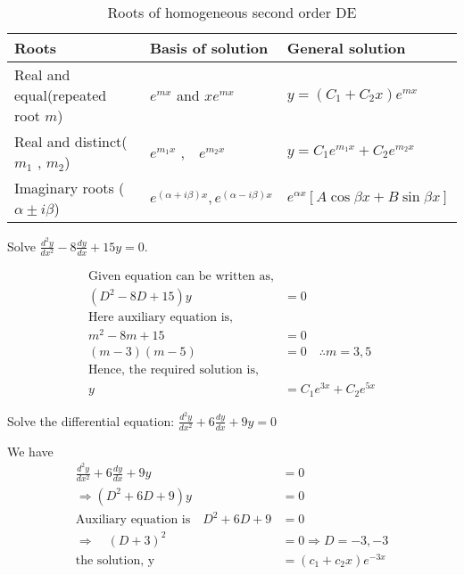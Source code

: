 \setlength\extrarowheight{10pt}
\begin{table}[H]
\begin{tabular}{|m{5cm}|m{4cm}|m{4cm}|}
\hline
Roots&Basis of solution&General solution\\\hline
Real and  equal(repeated root $m$)& $e^{m x}$ and $xe^{m x}$&$
y=\left(C_{1}+C_{2} x\right) e^{m x}
$\\\hline
Real and  distinct($m_{1}$ , $m_{2}$)& $e^{m_{1} x}$ ,$\quad e^{m_{2} x}$ &$
y=C_{1} e^{m_{1} x}+C_{2} e^{m_{2} x}
$\\\hline
Imaginary roots ($\alpha \pm i \beta$)&$ e^{(\alpha+i \beta) x}, e^{(\alpha-i \beta) x}$&$e^{\alpha x}[A \cos \beta x+B \sin \beta x]$\\\hline

\end{tabular}
\caption{Roots of homogeneous second order DE}
\end{table}
\begin{exercise}
	Solve $\frac{d^{2} y}{d x^{2}}-8 \frac{d y}{d x}+15 y=0$.
\end{exercise}
\begin{answer}
	\begin{align*}
	\text{Given equation can be written as,}\\
	\left(D^{2}-8 D+15\right) y&=0\\
	\text{Here auxiliary equation is,}\\ m^{2}-8 m+15&=0\\
	(m-3)(m-5)&=0 \quad \therefore m=3,5\\\text{Hence, the required solution is,}\\
	y&=C_{1} e^{3 x}+C_{2} e^{5 x}
	\end{align*}
\end{answer}
\begin{exercise}
	Solve the differential equation:
	$
	\frac{d^{2} y}{d x^{2}}+6 \frac{d y}{d x}+9 y=0
	$
\end{exercise}
\begin{answer}
We have
\begin{align*}
\frac{d^{2} y}{d x^{2}}+6 \frac{d y}{d x}+9 y&=0 \\
\Rightarrow \left(D^{2}+6 D+9\right) y&=0\\
\text{Auxiliary equation is}\quad D^{2}+6 D+9&=0\\
\Rightarrow \quad(D+3)^{2}&=0 \Rightarrow D=-3,-3\\
\text{the solution, y}&=\left(c_{1}+c_{2} x\right) e^{-3 x}
\end{align*}
\end{answer}
